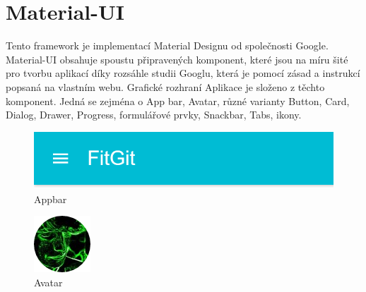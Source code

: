 \section{Material-UI}

Tento framework je implementací Material Designu od společnosti Google. Material-UI obsahuje spoustu připravených komponent, které jsou na míru šité pro tvorbu aplikací díky rozsáhle studii Googlu, která je pomocí zásad a instrukcí popsaná na vlastním webu. Grafické rozhraní Aplikace je složeno z těchto komponent. Jedná se zejména o App bar, Avatar, různé varianty Button, Card, Dialog, Drawer, Progress, formulářové prvky, Snackbar, Tabs, ikony.

\begin{figure}
	\centering
	\includegraphics[scale=0.5]{sections/ui/images/Appbar.png}
	\caption{Appbar}
\end{figure}

\begin{figure}
	\centering
	\includegraphics[scale=0.5]{sections/ui/images/Avatar.png}
	\caption{Avatar}
\end{figure}

